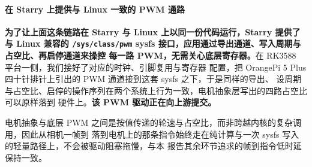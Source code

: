 \paragraph{在 Starry 上提供与 Linux 一致的 PWM 通路}
\textbf{为了让上面这条链路在 Starry 与 Linux 上以同一份代码运行，Starry 提供了与 Linux 兼容的
\texttt{/sys/class/pwm} sysfs 接口，应用通过导出通道、写入周期与占空比、再启停通道来操控
每一路 PWM，无需关心底层寄存器。}在 RK3588 平台一侧，我们接好了对应的时钟、引脚复用与寄存器
配置，把 OrangePi 5 Plus 四十针排针上引出的 PWM 通道接到这套 sysfs 之下，于是同样的导出、
设周期与占空比、启停的操作序列在两个系统上行为一致，电机抽象层写出的四路占空比可以原样落到
硬件上。\textbf{该 PWM 驱动正在向上游提交。}

电机抽象与底层 PWM 之间是按值传递的轮速与占空比，而非跨越内核的复杂调用，因此从相机一帧到
落到电机上的那条指令始终走在纯计算与一次 sysfs 写入的轻量路径上，不会被驱动阻塞拖慢，与本
报告其余环节追求的帧到指令低时延保持一致。
